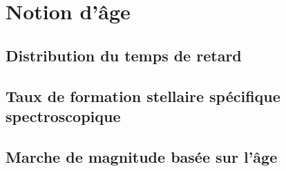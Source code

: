 \documentclass[../main/main.tex]{subfiles}
\begin{document}
\section{Notion d'âge}\label{ssec:spectro}
\subsection{Distribution du temps de retard}\label{sssec:dtd}
\subsection{Taux de formation stellaire spécifique spectroscopique}\label{sssec:lssfr}
\subsection{Marche de magnitude basée sur l'âge}\label{sssec:astep}

\newpage

\minilof
\minilot

% 
% 
\end{document}
